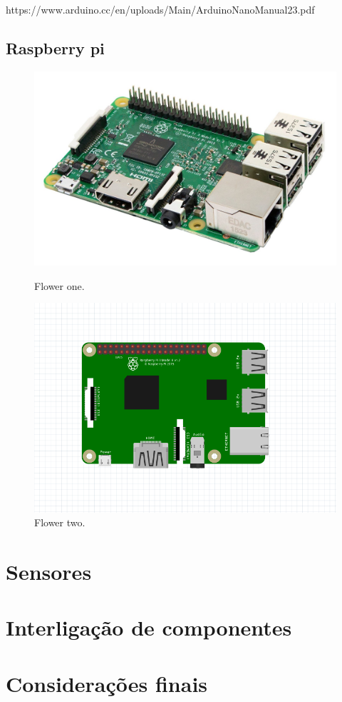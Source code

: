 https://www.arduino.cc/en/uploads/Main/ArduinoNanoManual23.pdf


\newpage

\subsection{Raspberry pi }


\begin{figure}[h]
	\centering
	\begin{minipage}[b]{0.4\textwidth}
		\includegraphics[width=\textwidth]{img/hardware/rasp3-img.jpg}
		\caption{Flower one.}
	\end{minipage}
	\hfill
	\begin{minipage}[b]{0.4\textwidth}
		\includegraphics[width=\textwidth]{img/hardware/rasp-esquema.PNG}
		\caption{Flower two.}
	\end{minipage}
\end{figure}



\newpage
\section{Sensores}




\newpage
\section{Interligação de componentes}




\section{Considerações finais}
